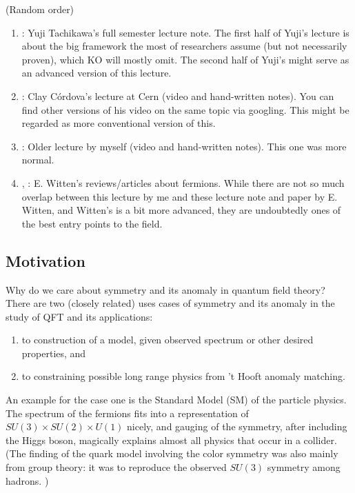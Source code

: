 \documentclass[
]{scrartcl}
\providecommand{\tightlist}{%
  \setlength{\itemsep}{0pt}\setlength{\parskip}{0pt}}
\numberwithin{equation}{section}
\theoremstyle{definition}
\theoremstyle{definition}
\theoremstyle{definition}
\theoremstyle{definition}
\theoremstyle{remark}
\begin{document}
(Random order)

\begin{enumerate}
\def\labelenumi{\arabic{enumi}.}
\item
  \textcite{tachikawa_2019}:
  Yuji Tachikawa's full semester lecture note.
  The first half of Yuji's lecture is about the big framework the most of researchers assume (but not necessarily proven), which KO will mostly omit.
  The second half of Yuji's might serve as an advanced version of this lecture.
\item
  \textcite{cordova_2020}:
  Clay Córdova's lecture at Cern (video and hand-written notes). You can find other versions of his video on the same topic via googling. This might be regarded as more conventional version of this.
\item
  \textcite{ohmori_2020}:
  Older lecture by myself (video and hand-written notes). This one was more normal.
\item
  \textcite{Witten:2015aoa}, \textcite{Witten:2015aba}:
  E. Witten's reviews/articles about fermions.
  While there are not so much overlap between this lecture by me and these lecture note and paper by E. Witten, and Witten's is a bit more advanced, they are undoubtedly ones of the best entry points to the field.
\end{enumerate}

\hypertarget{motivation}{%
\subsection{Motivation}\label{motivation}}

Why do we care about symmetry and its anomaly in quantum field theory?
There are two (closely related) uses cases of symmetry and its anomaly in the study of QFT and its applications:

\begin{enumerate}
\def\labelenumi{\arabic{enumi}.}
\tightlist
\item
  to construction of a model, given observed spectrum or other desired properties, and
\item
  to constraining possible long range physics from 't Hooft anomaly matching.
\end{enumerate}

An example for the case one is the Standard Model (SM) of the particle physics.
The spectrum of the fermions fits into a representation of \(SU(3)\times SU(2) \times U(1)\) nicely, and gauging of the symmetry, after including the Higgs boson, magically explains almost all physics that occur in a collider. (The finding of the quark model involving the color symmetry was also mainly from group theory: it was to reproduce the observed \(SU(3)\) symmetry among hadrons. )
\end{document}
